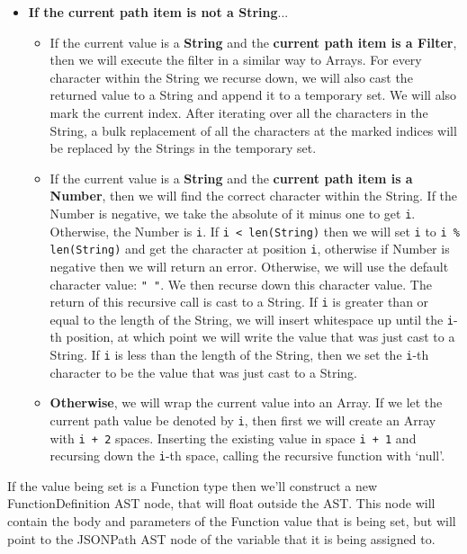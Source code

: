 \begin{center}
\begin{itemize}
\begin{itemize}
\begin{itemize}
                \item \textbf{If the current path item is not a String}...
                \begin{itemize}
                    \item If the current value is a \textbf{String} and the \textbf{current path item is a Filter}, then we will execute the filter in a similar way to Arrays. For every character within the String we recurse down, we will also cast the returned value to a String and append it to a temporary set. We will also mark the current index. After iterating over all the characters in the String, a bulk replacement of all the characters at the marked indices will be replaced by the Strings in the temporary set.
                    \item If the current value is a \textbf{String} and the \textbf{current path item is a Number}, then we will find the correct character within the String. If the Number is negative, we take the absolute of it minus one to get \verb|i|. Otherwise, the Number is \verb|i|. If \verb|i < len(String)| then we will set \verb|i| to \verb|i % len(String)| and get the character at position \verb|i|, otherwise if Number is negative then we will return an error. Otherwise, we will use the default character value: \verb|" "|. We then recurse down this character value. The return of this recursive call is cast to a String. If \verb|i| is greater than or equal to the length of the String, we will insert whitespace up until the \verb|i|-th position, at which point we will write the value that was just cast to a String. If \verb|i| is less than the length of the String, then we set the \verb|i|-th character to be the value that was just cast to a String.
                    \item \textbf{Otherwise}, we will wrap the current value into an Array. If we let the current path value be denoted by \verb|i|, then first we will create an Array with \verb|i + 2| spaces. Inserting the existing value in space \verb|i + 1| and recursing down the \verb|i|-th space, calling the recursive function with `null'.
                \end{itemize}
            \end{itemize}
        \end{itemize}
    \end{itemize}
\end{center}

If the value being set is a Function type then we'll construct a new FunctionDefinition AST node, that will float outside the AST. This node will contain the body and parameters of the Function value that is being set, but will point to the JSONPath AST node of the variable that it is being assigned to.

